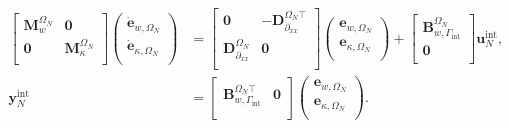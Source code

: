 \begin{tcolorbox}[colframe=red,title=Subdomain $\Omega_N$, coltitle=white]%
	\begin{equation}\label{eq:pHfindim_EB_OmN}
	\begin{aligned}
	\begin{bmatrix}
	\mathbf{M}_{w}^{\Omega_N} & \mathbf{0} \\
	\mathbf{0} & \mathbf{M}_{\kappa}^{\Omega_N} \\
	\end{bmatrix}
	\begin{pmatrix}
	\dot{\mathbf{e}}_{w, \Omega_N}\\
	\dot{\mathbf{e}}_{\kappa, \Omega_N}\\
	\end{pmatrix}
	&= \begin{bmatrix}
	\mathbf{0} & -\mathbf{D}_{\partial_{xx}}^{\Omega_N \top}\\
	\mathbf{D}_{\partial_{xx}}^{\Omega_N} & \mathbf{0}\\
	\end{bmatrix}
	\begin{pmatrix}
	{\mathbf{e}}_{w, \Omega_N}\\
	{\mathbf{e}}_{\kappa, \Omega_N}\\
	\end{pmatrix} + \begin{bmatrix}
	\mathbf{B}_{w, \Gamma_{\text{int}}}^{\Omega_N}\\
	\mathbf{0}\\
	\end{bmatrix}\mathbf{u}_N^{\text{int}}, \\
	\mathbf{y}_N^{\text{int}} &=
	\begin{bmatrix}
	\mathbf{B}_{w, \Gamma_{\text{int}}}^{\Omega_N \top} & \mathbf{0}\\ 
	\end{bmatrix}
	\begin{pmatrix}
	{\mathbf{e}}_{w, \Omega_N}\\
	{\mathbf{e}}_{\kappa, \Omega_N}\\
	\end{pmatrix}.
	\end{aligned}	
	\end{equation}
\end{tcolorbox}
